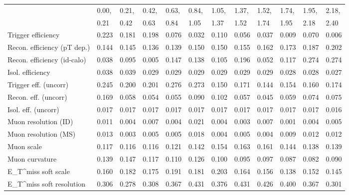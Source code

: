\begin{tabular}{l|p{0.6cm}p{0.6cm}p{0.6cm}p{0.6cm}p{0.6cm}p{0.6cm}p{0.6cm}p{0.6cm}p{0.6cm}p{0.6cm}p{0.6cm}}
\hline
   & 0.00, & 0.21, & 0.42, & 0.63, & 0.84, & 1.05, & 1.37, & 1.52, & 1.74, & 1.95, & 2.18,  \\ 
   & 0.21 & 0.42 & 0.63 & 0.84 & 1.05 & 1.37 & 1.52 & 1.74 & 1.95 & 2.18 & 2.40  \\ 
\hline
Trigger efficiency                       & 0.223 & 0.181 & 0.198 & 0.076 & 0.032 & 0.110 & 0.056 & 0.037 & 0.009 & 0.070 & 0.006 \\
Recon. efficiency (pT dep.)              & 0.144 & 0.145 & 0.136 & 0.139 & 0.150 & 0.150 & 0.155 & 0.162 & 0.173 & 0.187 & 0.202 \\
Recon. efficiency (id-calo)              & 0.038 & 0.095 & 0.005 & 0.147 & 0.138 & 0.105 & 0.196 & 0.052 & 0.117 & 0.274 & 0.274 \\
Isol. efficiency                         & 0.038 & 0.039 & 0.029 & 0.029 & 0.029 & 0.029 & 0.029 & 0.029 & 0.028 & 0.028 & 0.027 \\
Trigger eff. (uncorr)                    & 0.245 & 0.200 & 0.201 & 0.276 & 0.273 & 0.150 & 0.171 & 0.144 & 0.154 & 0.160 & 0.174 \\
Recon. eff. (uncorr)                     & 0.169 & 0.058 & 0.054 & 0.055 & 0.090 & 0.102 & 0.057 & 0.045 & 0.059 & 0.074 & 0.075 \\
Isol. eff. (uncorr)                      & 0.017 & 0.017 & 0.017 & 0.017 & 0.017 & 0.017 & 0.017 & 0.017 & 0.017 & 0.017 & 0.016 \\
Muon resolution (ID)                     & 0.011 & 0.004 & 0.007 & 0.004 & 0.021 & 0.004 & 0.003 & 0.007 & 0.001 & 0.004 & 0.005 \\
Muon resolution (MS)                     & 0.013 & 0.003 & 0.005 & 0.005 & 0.018 & 0.004 & 0.005 & 0.004 & 0.009 & 0.012 & 0.012 \\
Muon scale                               & 0.117 & 0.116 & 0.116 & 0.121 & 0.142 & 0.154 & 0.163 & 0.161 & 0.144 & 0.138 & 0.139 \\
Muon curvature                           & 0.139 & 0.147 & 0.117 & 0.110 & 0.126 & 0.100 & 0.095 & 0.097 & 0.087 & 0.082 & 0.090 \\
E_{T}^{miss} soft scale                  & 0.160 & 0.182 & 0.175 & 0.191 & 0.181 & 0.203 & 0.164 & 0.156 & 0.138 & 0.152 & 0.145 \\
E_{T}^{miss} soft resolution             & 0.306 & 0.278 & 0.308 & 0.367 & 0.431 & 0.376 & 0.431 & 0.426 & 0.400 & 0.367 & 0.301 \\

\end{tabular}
